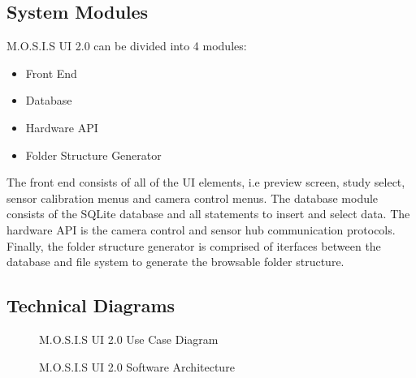 \subsection{System Modules}
M.O.S.I.S UI 2.0 can be divided into 4 modules:
\begin{itemize}
	\item Front End
	\item Database
	\item Hardware API
	\item Folder Structure Generator
\end{itemize}
The front end consists of all of the UI elements, i.e preview screen, study select, sensor calibration menus and camera control menus.
The database module consists of the SQLite database and all statements to insert and select data. The hardware API is the camera control and sensor hub communication protocols. Finally, the folder structure generator is comprised of iterfaces between the database and file system to generate the browsable folder structure. 
\subsection{Technical Diagrams}
\begin{center}
	\begin{figure}[H]
		\centering
		\caption[]{M.O.S.I.S UI 2.0 Use Case Diagram}
	\end{figure}
	\begin{figure}[H]
		\caption[]{M.O.S.I.S UI 2.0 Software Architecture}
	\end{figure}
\end{center}